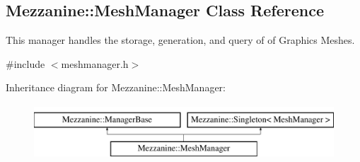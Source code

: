 \hypertarget{classMezzanine_1_1MeshManager}{
\subsection{Mezzanine::MeshManager Class Reference}
\label{classMezzanine_1_1MeshManager}
}


This manager handles the storage, generation, and query of of Graphics Meshes.  




{\ttfamily \#include $<$meshmanager.h$>$}

Inheritance diagram for Mezzanine::MeshManager:\begin{figure}[H]
\begin{center}
\leavevmode
\includegraphics[height=2.000000cm]{classMezzanine_1_1MeshManager}
\end{center}
\end{figure}
